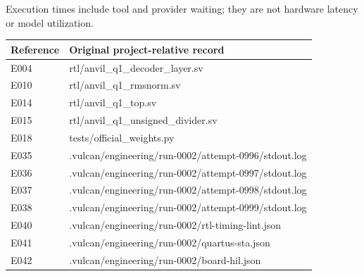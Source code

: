 \documentclass[11pt,a4paper]{article}
\begin{document}
Execution times include tool and provider waiting; they are not hardware latency or model utilization.

{\small\renewcommand{\arraystretch}{1.18}\begin{longtable}{@{}L{0.12\textwidth}|L{0.82\textwidth}@{}}\toprule

\textbf{Reference} & \textbf{Original project-relative record}\\\midrule\endhead

E004 & rtl/\allowbreak{}anvil\_\allowbreak{}q1\_\allowbreak{}decoder\_\allowbreak{}layer.sv\\[2pt]\hline

E010 & rtl/\allowbreak{}anvil\_\allowbreak{}q1\_\allowbreak{}rmsnorm.sv\\[2pt]\hline

E014 & rtl/\allowbreak{}anvil\_\allowbreak{}q1\_\allowbreak{}top.sv\\[2pt]\hline

E015 & rtl/\allowbreak{}anvil\_\allowbreak{}q1\_\allowbreak{}unsigned\_\allowbreak{}divider.sv\\[2pt]\hline

E018 & tests/\allowbreak{}official\_\allowbreak{}weights.py\\[2pt]\hline

E035 & .vulcan/\allowbreak{}engineering/\allowbreak{}run-0002/\allowbreak{}attempt-0996/\allowbreak{}stdout.log\\[2pt]\hline

E036 & .vulcan/\allowbreak{}engineering/\allowbreak{}run-0002/\allowbreak{}attempt-0997/\allowbreak{}stdout.log\\[2pt]\hline

E037 & .vulcan/\allowbreak{}engineering/\allowbreak{}run-0002/\allowbreak{}attempt-0998/\allowbreak{}stdout.log\\[2pt]\hline

E038 & .vulcan/\allowbreak{}engineering/\allowbreak{}run-0002/\allowbreak{}attempt-0999/\allowbreak{}stdout.log\\[2pt]\hline

E040 & .vulcan/\allowbreak{}engineering/\allowbreak{}run-0002/\allowbreak{}rtl-timing-lint.json\\[2pt]\hline

E041 & .vulcan/\allowbreak{}engineering/\allowbreak{}run-0002/\allowbreak{}quartus-sta.json\\[2pt]\hline

E042 & .vulcan/\allowbreak{}engineering/\allowbreak{}run-0002/\allowbreak{}board-hil.json\\[2pt]\hline


\end{longtable}}
\end{document}
